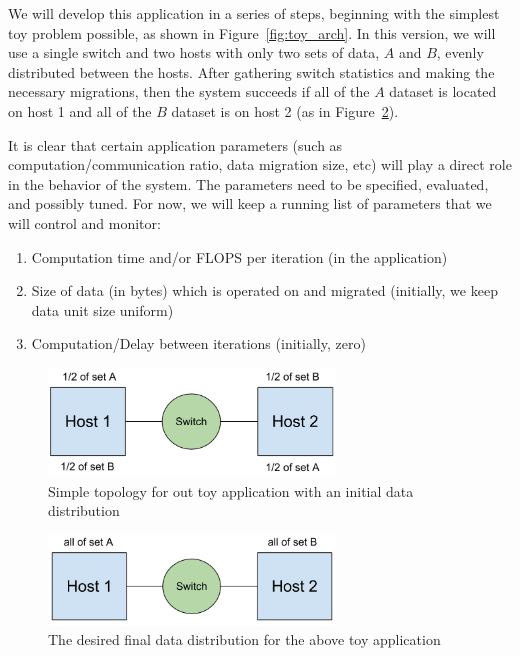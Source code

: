 \documentclass[12pt]{article} \usepackage{graphicx} \usepackage{amsmath}
\begin{document}
We will develop this application in a series of steps, beginning with the
simplest toy problem possible, as shown in Figure~\ref{fig:toy_arch}.  In this
version, we will use a single switch and two hosts with only two sets of data,
$A$ and $B$, evenly distributed between the hosts.  After gathering switch
statistics and making the necessary migrations, then the system succeeds if all
of the $A$ dataset is located on host 1 and all of the $B$ dataset is on host 2
(as in Figure~\ref{fig:toy2}).

It is clear that certain application parameters (such as
computation/communication ratio, data migration size, etc) will play a direct
role in the behavior of the system.  The parameters need to be specified,
evaluated, and possibly tuned.  For now, we will keep a running list of
parameters that we will control and monitor: 
\begin{enumerate} 
  \item Computation time and/or FLOPS per iteration (in the application) 
  \item Size of data (in bytes) which is operated on and migrated (initially, we keep
  data unit size uniform) 
  \item Computation/Delay between iterations (initially, zero)
\end{enumerate}

\begin{figure}[t] \centerline{\includegraphics[width=3.0in]{img/toy1.png}}
\caption{Simple topology for out toy application with an initial data
distribution} \label{fig:toy1} \end{figure}

\begin{figure}[t] \centerline{\includegraphics[width=3.0in]{img/toy2.png}}
\caption{The desired final data distribution for the above toy application}
\label{fig:toy2} \end{figure}
\end{document}
